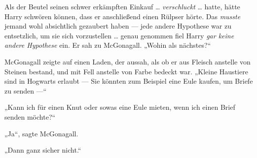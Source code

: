 Als der Beutel seinen schwer erkämpften Einkauf … \emph{verschluckt} … hatte, hätte Harry schwören können, dass er anschließend einen Rülpser hörte. Das \emph{musste} jemand wohl absichtlich gezaubert haben — jede andere Hypothese war zu entsetzlich, um sie sich vorzustellen … genau genommen fiel Harry \emph{gar keine andere Hypothese} ein. Er sah zu McGonagall.
„Wohin als nächstes?“

McGonagall zeigte auf einen Laden, der aussah, als ob er aus Fleisch anstelle von Steinen bestand, und mit Fell anstelle von Farbe bedeckt war.
„Kleine Haustiere sind in Hogwarts erlaubt — Sie könnten zum Beispiel eine Eule kaufen, um Briefe zu senden —“

„Kann ich für einen Knut oder sowas eine Eule mieten, wenn ich einen Brief senden möchte?“

„Ja“, sagte McGonagall.

„Dann ganz sicher nicht.“

